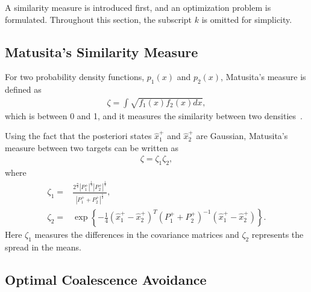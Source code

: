 \documentclass[letterpaper, 10pt, conference]{ieeeconf}
\begin{document}
A similarity measure is introduced first, and an optimization problem is formulated. Throughout this section, the subscript $k$ is omitted for simplicity. 







	
\subsection{Matusita's Similarity Measure}

For two probability density functions, $p_1(x)$ and $p_2(x)$, Matusita's measure is defined as
\begin{align*}
\zeta = \int \sqrt{f_1(x)f_2(x) dx},
\end{align*}
which is between 0 and 1, and it measures the similarity between two densities~\cite{Coal_k}. 

Using the fact that the posteriori states $\hat x_1^+$ and $\hat x_2^+$ are Gaussian, Matusita's measure between two targets can be written as
\begin{align}
\zeta=\zeta_1\zeta_2,
\end{align}
where
\begin{align}
\label{Q}
\zeta_1=&\frac{2^\frac{n}{2}|P_1^+|^{\frac{1}{4}}|P_2^+|^{\frac{1}{4}}}{|P_1^++P_2^+|^{\frac{1}{2}}},\\
\label{R}
\zeta_2=&\exp{\left\{-\frac{1}{4}(\hat x^+_1-\hat x^+_2)^T(P_1^++P_2^+)^{-1}(\hat x^+_1-\hat x^+_2)\right\}}.
\end{align}
Here $\zeta_1$ measures the differences in the covariance matrices and $\zeta_2$ represents the spread in the means.
	
\subsection{Optimal Coalescence Avoidance}
\end{document}
